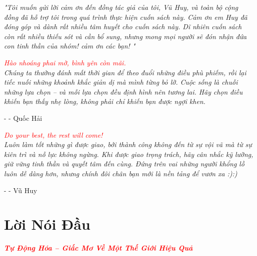 \documentclass[a4paper,12pt]{book}
\begin{document}
\textit{"Tôi muốn gửi lời cảm ơn đến đồng tác giả của tôi, Vũ Huy, và toàn bộ cộng đồng đã hỗ trợ tôi trong quá trình thực hiện cuốn sách này. Cảm ơn em Huy đã đóng góp và dành rất nhiều tâm huyết cho cuốn sách này. Dĩ nhiên cuốn sách còn rất nhiều thiếu sót và cần bổ sung, nhưng mong mọi người sẽ đón nhận đứa con tinh thần của nhóm! cảm ơn các bạn! "}


\newpage

\noindent\vspace{5cm}

\begin{center}
    \textit{ \textcolor{red}{Hào nhoáng phai mờ, bình yên còn mãi.}\\
    Chúng ta thường đánh mất thời gian để theo đuổi những điều phù phiếm, rồi lại tiếc nuối những khoảnh khắc giản dị mà mình từng bỏ lỡ. Cuộc sống là chuỗi những lựa chọn – và mỗi lựa chọn đều định hình nên tương lai. Hãy chọn điều khiến bạn thấy nhẹ lòng, không phải chỉ khiến bạn được ngợi khen.}
    
    \vspace{0.5cm}
    \hspace{10cm}
    - - Quốc Hải 
\end{center}

\vspace{2cm}

\begin{center}
    \textit{\textcolor{red}{Do your best, the rest will come!}\\
    Luôn làm tốt những gì được giao, bởi thành công không đến từ sự vội vã mà từ sự kiên trì và nỗ lực không ngừng. Khi được giao trọng trách, hãy cân nhắc kỹ lưỡng, giữ vững tinh thần và quyết tâm đến cùng. Đứng trên vai những người khổng lồ luôn dễ dàng hơn, nhưng chính đôi chân bạn mới là nền tảng để vươn xa :):)}

    \vspace{0.5cm}
    \hspace{10cm}
    - - Vũ Huy
\end{center}

\newpage

\chapter*{Lời Nói Đầu}
\fontsize{13pt}{16pt}\selectfont
\begin{center}
    \textit{\textcolor{red}{\textbf{Tự Động Hóa – Giấc Mơ Về Một Thế Giới Hiệu Quả}}}
\end{center}
\end{document}
